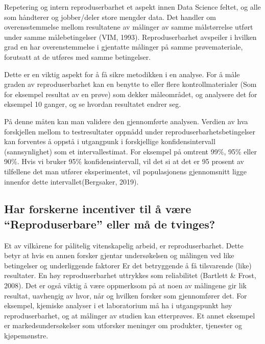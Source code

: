 \documentclass[
  norsk,
]{article}
\begin{document}
Repetering og intern reproduserbarhet et aspekt innen Data Science
feltet, og alle som håndterer og jobber/deler store mengder data. Det
handler om overensstemmelse mellom resultatene av målinger av samme
målstørrelse utført under samme målebetingelser (VIM, 1993).
Reproduserbarhet avspeiler i hvilken grad en har overenstemmelse i
gjentatte målinger på samme prøvemateriale, forutsatt at de utføres med
samme betingelser.

Dette er en viktig aspekt for å få sikre metodikken i en analyse. For å
måle graden av reproduserbarhet kan en benytte to eller flere
kontrollmaterialer (Som for eksempel resultat av en prøve) som dekker
måleområdet, og analysere det for eksempel 10 ganger, og se hvordan
resultatet endrer seg.

På denne måten kan man validere den gjennomførte analysen. Verdien av
hva forskjellen mellom to testresultater oppnådd under
reproduserbarhetsbetingelser kan forventes å oppstå i utgangpunk i
forskjellige konfidensintervall (sannsynlighet) som et intervallestimat.
For eksempel på omtrent 99\%, 95\% eller 90\%. Hvis vi bruker 95\%
konfidensintervall, vil det si at det er 95 prosent av tilfellene det
man utfører eksperimentet, vil populasjonens gjennomsnitt ligge innenfor
dette intervallet(Bergsaker, 2019).

\hypertarget{har-forskerne-incentiver-til-uxe5-vuxe6re-reproduserbare-eller-muxe5-de-tvinges}{%
\subsection{\texorpdfstring{\textbf{Har forskerne incentiver til å være
``Reproduserbare'' eller må de
tvinges?}}{Har forskerne incentiver til å være ``Reproduserbare'' eller må de tvinges?}}\label{har-forskerne-incentiver-til-uxe5-vuxe6re-reproduserbare-eller-muxe5-de-tvinges}}

Et av vilkårene for pålitelig vitenskapelig arbeid, er reproduserbarhet.
Dette betyr at hvis en annen forsker gjentar undersøkelsen og målingen
ved like betingelser og underliggende faktorer Er det betryggende å få
tilsvarende (like) resultater. En høy reproduserbarhet uttrykkes som
reliabilitet (Bartlett \& Frost, 2008). Det er også viktig å være
oppmerksom på at noen av målingene gir lik resultat, uavhengig av hvor,
når og hvilken forsker som gjennomfører det. For eksempel, kjemiske
analyser i et laboratorium må ha i utgangspunkt høy reproduserbarhet, og
at målinger av studien kan etterprøves. Et annet eksempel er
markedsundersøkelser som utforsker meninger om produkter, tjenester og
kjøpemønstre.
\end{document}
